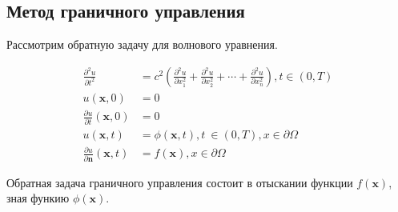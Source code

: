 \subsection{Метод граничного управления}

Рассмотрим обратную задачу для волнового уравнения.

\begin{align*}
    \frac{\partial^2 u}{\partial t^2}
    &=
    c^2
    \left(
    \frac{\partial^2 u}{\partial x_1^2}
    + \frac{\partial^2 u}{\partial x_2^2}
    + \cdots
    + \frac{\partial^2 u}{\partial x_n^2}
    \right)
    ,
    t \in \left( 0, T \right)
    \\
    u \left( \mathbf{x}, 0 \right) &= 0 \\
    \frac{\partial u}{\partial t} \left( \mathbf{x}, 0 \right) &= 0 \\
    u \left( \mathbf{x}, t \right)
    &=
    \phi \left( \mathbf{x}, t \right),
    t \ \in \left( 0, T \right), x \in \partial \Omega
    \\
    \frac{\partial u}{\partial \mathbf{n}} \left( \mathbf{x}, t \right)
    &=
    f \left( \mathbf{x} \right)
    ,
    x \in \partial \Omega
\end{align*}

Обратная задача граничного управления состоит в
отыскании функции \( f \left( \mathbf{x} \right) \),
зная функию \( \phi \left( \mathbf{x} \right) \).
